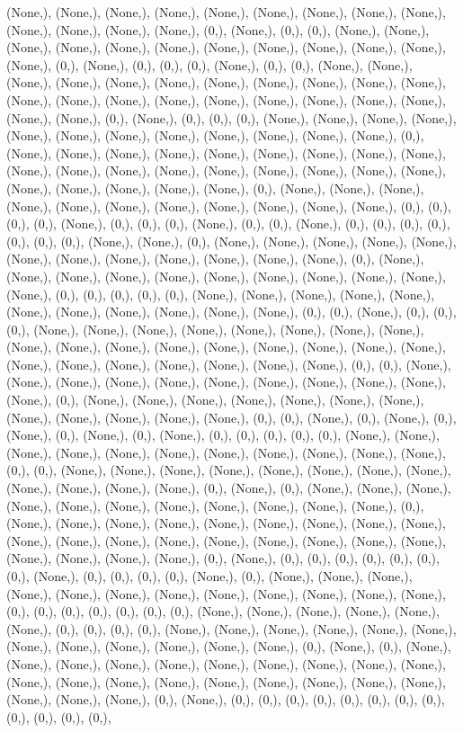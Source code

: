 \documentclass{article}
\begin{document}
(None,), (None,), (None,), (None,), (None,), (None,), (None,), (None,), (None,), (None,), (None,), (None,), (None,), (0,), (None,), (0,), (0,), (None,), (None,), (None,), (None,), (None,), (None,), (None,), (None,), (None,), (None,), (None,), (None,), (0,), (None,), (0,), (0,), (0,), (None,), (0,), (0,), (None,), (None,), (None,), (None,), (None,), (None,), (None,), (None,), (None,), (None,), (None,), (None,), (None,), (None,), (None,), (None,), (None,), (None,), (None,), (None,), (None,), (None,), (0,), (None,), (0,), (0,), (0,), (None,), (None,), (None,), (None,), (None,), (None,), (None,), (None,), (None,), (None,), (None,), (None,), (0,), (None,), (None,), (None,), (None,), (None,), (None,), (None,), (None,), (None,), (None,), (None,), (None,), (None,), (None,), (None,), (None,), (None,), (None,), (None,), (None,), (None,), (None,), (None,), (0,), (None,), (None,), (None,), (None,), (None,), (None,), (None,), (None,), (None,), (None,), (None,), (0,), (0,), (0,), (0,), (None,), (0,), (0,), (0,), (None,), (0,), (0,), (None,), (0,), (0,), (0,), (0,), (0,), (0,), (0,), (None,), (None,), (0,), (None,), (None,), (None,), (None,), (None,), (None,), (None,), (None,), (None,), (None,), (None,), (None,), (0,), (None,), (None,), (None,), (None,), (None,), (None,), (None,), (None,), (None,), (None,), (None,), (0,), (0,), (0,), (0,), (0,), (None,), (None,), (None,), (None,), (None,), (None,), (None,), (None,), (None,), (None,), (None,), (0,), (0,), (None,), (0,), (0,), (0,), (None,), (None,), (None,), (None,), (None,), (None,), (None,), (None,), (None,), (None,), (None,), (None,), (None,), (None,), (None,), (None,), (None,), (None,), (None,), (None,), (None,), (None,), (None,), (None,), (0,), (0,), (None,), (None,), (None,), (None,), (None,), (None,), (None,), (None,), (None,), (None,), (None,), (0,), (None,), (None,), (None,), (None,), (None,), (None,), (None,), (None,), (None,), (None,), (None,), (None,), (0,), (0,), (None,), (0,), (None,), (0,), (None,), (0,), (None,), (0,), (None,), (0,), (0,), (0,), (0,), (0,), (None,), (None,), (None,), (None,), (None,), (None,), (None,), (None,), (None,), (None,), (None,), (0,), (0,), (None,), (None,), (None,), (None,), (None,), (None,), (None,), (None,), (None,), (None,), (None,), (None,), (0,), (None,), (0,), (None,), (None,), (None,), (None,), (None,), (None,), (None,), (None,), (None,), (None,), (None,), (0,), (None,), (None,), (None,), (None,), (None,), (None,), (None,), (None,), (None,), (None,), (None,), (None,), (None,), (None,), (None,), (None,), (None,), (None,), (None,), (None,), (None,), (None,), (0,), (None,), (0,), (0,), (0,), (0,), (0,), (0,), (0,), (None,), (0,), (0,), (0,), (0,), (None,), (0,), (None,), (None,), (None,), (None,), (None,), (None,), (None,), (None,), (None,), (None,), (None,), (None,), (0,), (0,), (0,), (0,), (0,), (0,), (0,), (None,), (None,), (None,), (None,), (None,), (None,), (0,), (0,), (0,), (0,), (None,), (None,), (None,), (None,), (None,), (None,), (None,), (None,), (None,), (None,), (None,), (None,), (0,), (None,), (0,), (None,), (None,), (None,), (None,), (None,), (None,), (None,), (None,), (None,), (None,), (None,), (None,), (None,), (None,), (None,), (None,), (None,), (None,), (None,), (None,), (None,), (None,), (0,), (None,), (0,), (0,), (0,), (0,), (0,), (0,), (0,), (0,), (0,), (0,), (0,), (0,), 
\end{document}
